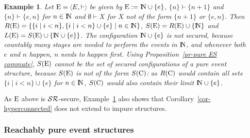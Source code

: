 \documentclass[twocolumn]{article}
\newcommand{\out}[1]{}        \newcommand{\ams}[1]{#1}      \usepackage[preserveurlmacro]{breakurl}
\newtheorem{exam}{Example}
\newenvironment{example}[1]{\begin{exam} \rm \label{ex-#1} }{\end{exam}}
\newcommand{\pr}[1]{Proposition~\ref{pr-#1}}
\newcommand{\cor}[1]{Corollary~\ref{cor-#1}}
\newcommand{\ex}[1]{Example~\ref{ex-#1}}
\newcommand{\phrase}[1]{\index{#1}{\em #1}}		\newcommand{\implies}{\Rightarrow}
\newcommand{\turn}{\vdash}                              \newcommand{\dbigcup}{\bigcup_{\uparrow}}		\newcommand{\nbigcup}{\bigcup_{\bullet}}		\newcommand{\nbigcap}{\bigcap_{\bullet}}		\newcommand{\bbigcup}{\overline{\bigcup}}		\newcommand{\bbigcap}{\overline{\bigcap}}		\newcommand{\nbbigcap}{\bbigcap_{\bullet}}		\newcommand{\fbbigcup}{\overline{\bigcup}^f}		\newcommand{\bbbigcup}{\overline{\bigcup}^2}		\newcommand{\dcup}{~~\makebox[0pt]{\LARGE$\cdot$}\makebox[0pt]{$\cup$}~~}
\newcommand{\dl}[1]{\mbox{\rm I\hspace{-0.75mm}#1}}     \newcommand{\dc}[1]{\mbox{\rm {\raisebox{.4ex}{\makebox [0pt][l]{\hspace{.2em}\scriptsize $\mid$}}}#1}}
\newcommand{\IN}{\dl{N}}                        \newcommand{\IQ}{\dc{Q}}                        \newcommand{\IC}{\dc{C}}                        \newcommand{\IE}{\dl{E}}                        \newcommand{\IG}{\dc{G}}                        \newcommand{\fC}{{\cal C}}                      \newcommand{\fE}{{\cal E}}                      \newcommand{\fG}{{\cal G}}                      \newcommand{\fN}{{\cal N}}                      \newcommand{\fF}{{\cal F}}                      \newcommand{\fL}{{\cal L}}                      \newcommand{\fM}{{\cal M}}                      \newcommand{\fS}{{\cal S}}                      \newcommand{\fR}{{\cal R}}                      \newcommand{\eC}{{\rm C}}                       \newcommand{\eD}{{\rm D}}                       \newcommand{\eE}{{\rm E}}                       \newcommand{\eF}{{\rm F}}                       \newcommand{\eG}{{\rm G}}                       \newcommand{\eH}{{\rm H}}                       \newcommand{\eK}{{\rm K}}                       \newcommand{\eL}{{\rm L}}                       \newcommand{\eN}{{\rm N}}                       \newcommand{\eP}{{\rm P}}                       \newcommand{\eM}{{\rm M}}                       \newcommand{\eT}{{\rm T}}                       \newcommand{\fT}{{\cal T}}
\begin{document}
\begin{example}{unpurifiable}
Let $\eE=\tuple{E,\turn\;}$ be given by $\eE:=\IN\cup\{e\}$,
$\{n\}\turn\{n+1\}$ and $\{n\}\turn\{e,n\}$ for $n\in\IN$
and \mbox{$\emptyset\turn X$} for $X$ not of the form $\{n+1\}$ or $\{e,n\}$.
Then\linebreak
$R(\eE)=\{\{i\mid i<n\},\{i\mid i<n\}\cup\{e\}\mid n\in\IN\}$,
$S(\eE)=R(\eE)\cup\{\IN\}$ and $L(\eE)=S(\eE)\cup\{\IN\cup\{e\}\}$.
The configuration $\IN\cup\{e\}$ is not secured, because countably many
stages are needed to perform the events in $\IN$, and whenever both
$e$ and $n$ happen, $n$ needs to happen first.
Using \pr{pure ES commute}, $S(\eE)$ cannot be the set of secured
configurations of a pure event structure, because $S(\eE)$ is not of
the form $S(\eC)$: as $R(\eC)$ would contain all sets
$\{i\mid i<n\}\cup\{e\}$ for $n\in\IN$, $S(\eC)$ would also
contain their limit $\IN\cup\{e\}$.
\end{example}
As $\eE$ above is $\fS\fR$-secure, \ex{unpurifiable} also shows that
\cor{hyperconnected} does not extend to impure structures.

\subsubsection*{Reachably pure event structures}\label{reachably pure}

\out{
 As we will see in Section~\ref{brands}, those event structures
 appearing in the literature for which a notion of configuration
 has been studied that corresponds to our concept of a left-closed
 configuration translate to event structures in our sense that are pure.
 The notion of a secured configuration on the other hand has been
 applied to impure event structures as well. The event structures of
 \ex{impure} for instance can easily be cast as event structures in the
 sense of {\sc Winskel} \cite{Wi87a,Wi89}. However, the event structures
 studied before correspond to even structures in our sense that are
 \phrase{singular}, meaning that whenever $X\turn Y$, either $X=\emptyset$
 or $Y$ is a singleton. For such event structures impureness is
 harmless, because, as is straightforward to check, the impure bits of
 the enabling relation can be deleted without changing the set of
 secured configurations or the transition relation between them in any way.
}
\end{document}
